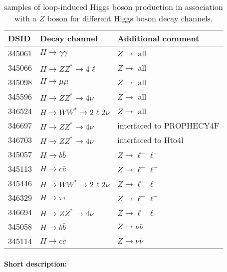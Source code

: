 \begin{table}[!htbp]
  \caption{\POWPY[8] samples of loop-induced Higgs boson production in association with a \(Z\) boson for different
  Higgs boson decay channels.}%
  \label{tab:higgs-ggZH-samples}
  \centering
  \begin{tabular}{ l | l | l}
    \toprule
    DSID   & Decay channel & Additional comment \\
    \midrule
    345061 & \(H \to \gamma\gamma\) & \(Z\to\) all \\
    345066 & \(H \to ZZ^{*} \to 4\ell\) & \(Z\to\) all \\
    345098 & \(H \to \mu\mu\) & \(Z\to\) all \\
    345596 & \(H \to ZZ^{*} \to 4\nu\) & \(Z\to\) all \\
    346524 & \(H \to WW^{*} \to 2\ell2\nu \) & \(Z\to\) all \\
    346697 & \(H \to ZZ^{*} \to 4\nu\) & interfaced to PROPHECY4F \\
    346703 & \(H \to ZZ^{*} \to 4\nu\) & interfaced to Hto4l \\
    345057 & \(H \to b\bar{b}\) &  \(Z\to \ell^{+}\ell^{-}\)\\
    345113 & \(H \to c\bar{c}\) & \(Z\to \ell^{+}\ell^{-}\)\\
    345446 & \(H \to WW^{*} \to 2\ell2\nu\) &  \(Z\to \ell^{+}\ell^{-}\)\\
    346329 & \(H \to \tau\tau\) &  \(Z\to \ell^{+}\ell^{-}\)\\
    346694 & \(H \to ZZ^{*} \to 4\nu\) &  \(Z\to \ell^{+}\ell^{-}\)\\
    345058 & \(H \to b\bar{b}\) & \(Z\to \nu\bar{\nu}\)\\
    345114 & \(H \to c\bar{c}\) & \(Z\to \nu\bar{\nu}\)\\
    \bottomrule
  \end{tabular}
\end{table}

\paragraph{Short description:}

